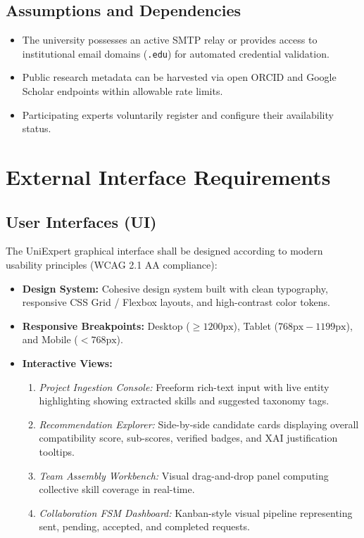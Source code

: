 \documentclass[11pt,a4paper]{article}
\begin{document}
\subsection{Assumptions and Dependencies}
\begin{itemize}[noitemsep]
    \item The university possesses an active SMTP relay or provides access to institutional email domains (\texttt{.edu}) for automated credential validation.
    \item Public research metadata can be harvested via open ORCID and Google Scholar endpoints within allowable rate limits.
    \item Participating experts voluntarily register and configure their availability status.
\end{itemize}

\clearpage
\section{External Interface Requirements}
\label{sec:interfaces}

\subsection{User Interfaces (UI)}
The UniExpert graphical interface shall be designed according to modern usability principles (WCAG 2.1 AA compliance):
\begin{itemize}[noitemsep]
    \item \textbf{Design System:} Cohesive design system built with clean typography, responsive CSS Grid / Flexbox layouts, and high-contrast color tokens.
    \item \textbf{Responsive Breakpoints:} Desktop ($\ge 1200\text{px}$), Tablet ($768\text{px} - 1199\text{px}$), and Mobile ($< 768\text{px}$).
    \item \textbf{Interactive Views:}
    \begin{enumerate}[label=\textbf{(\alph*)},noitemsep]
        \item \textit{Project Ingestion Console:} Freeform rich-text input with live entity highlighting showing extracted skills and suggested taxonomy tags.
        \item \textit{Recommendation Explorer:} Side-by-side candidate cards displaying overall compatibility score, sub-scores, verified badges, and XAI justification tooltips.
        \item \textit{Team Assembly Workbench:} Visual drag-and-drop panel computing collective skill coverage in real-time.
        \item \textit{Collaboration FSM Dashboard:} Kanban-style visual pipeline representing sent, pending, accepted, and completed requests.
    \end{enumerate}
\end{itemize}
\end{document}
